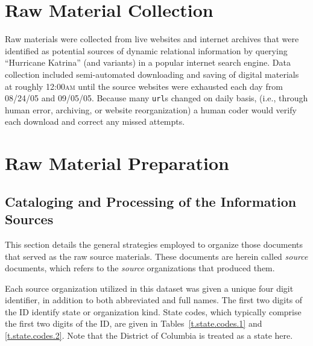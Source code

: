 \documentclass[11pt]{article}
\begin{document}
\section{Raw Material Collection}
Raw materials were collected from live websites and internet archives that were identified as potential sources of dynamic relational information by querying ``Hurricane Katrina'' (and variants) in a popular internet search engine. Data collection included semi-automated downloading and saving of digital materials at roughly 12:00\textsc{am} until the source websites were exhausted each day from 08/24/05 and 09/05/05. Because many \texttt{url}s changed on daily basis, (i.e., through human error, archiving, or website reorganization) a human coder would verify each download and correct any missed attempts.

\section{Raw Material Preparation}

\subsection{Cataloging and Processing of the Information Sources}

This section details the general strategies employed to organize those documents that served as the raw source materials.  These documents are herein called \textit{source} documents, which refers to the \textit{source} organizations that produced them.

Each source organization utilized in this dataset was given a unique four digit identifier, in addition to both abbreviated and full names.  The first two digits of the ID identify state or organization kind.  State codes, which typically comprise the first two digits of the ID, are given in Tables~\ref{t.state.codes.1} and \ref{t.state.codes.2}.  Note that the District of Columbia is treated as a state here.
\end{document}
